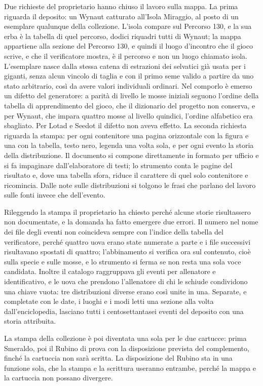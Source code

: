 Due richieste del proprietario hanno chiuso il lavoro sulla mappa. La prima riguarda il deposito: un Wynaut catturato all'Isola Miraggio, al posto di un esemplare qualunque della collezione. L'isola compare sul Percorso 130, e la sua erba è la tabella di quel percorso, dodici riquadri tutti di Wynaut; la mappa appartiene alla sezione del Percorso 130, e quindi il luogo d'incontro che il gioco scrive, e che il verificatore mostra, è il percorso e non un luogo chiamato isola. L'esemplare nasce dalla stessa catena di estrazioni dei selvatici già usata per i giganti, senza alcun vincolo di taglia e con il primo seme valido a partire da uno stato arbitrario, così da avere valori individuali ordinari. Nel comporlo è emerso un difetto del generatore: a parità di livello le mosse iniziali seguono l'ordine della tabella di apprendimento del gioco, che il dizionario del progetto non conserva, e per Wynaut, che impara quattro mosse al livello quindici, l'ordine alfabetico era sbagliato. Per Lotad e Seedot il difetto non aveva effetto. La seconda richiesta riguarda la stampa: per ogni contenitore una pagina orizzontale con la figura e una con la tabella, testo nero, legenda una volta sola, e per ogni evento la storia della distribuzione. Il documento si compone direttamente in formato per ufficio e si fa impaginare dall'elaboratore di testi; lo strumento conta le pagine del risultato e, dove una tabella sfora, riduce il carattere di quel solo contenitore e ricomincia. Dalle note sulle distribuzioni si tolgono le frasi che parlano del lavoro sulle fonti invece che dell'evento.

Rileggendo la stampa il proprietario ha chiesto perché alcune storie risultassero non documentate, e la domanda ha fatto emergere due errori. Il numero nel nome dei file degli eventi non coincideva sempre con l'indice della tabella del verificatore, perché quattro uova erano state numerate a parte e i file successivi risultavano spostati di quattro; l'abbinamento si verifica ora sul contenuto, cioè sulla specie e sulle mosse, e lo strumento si ferma se non resta una sola voce candidata. Inoltre il catalogo raggruppava gli eventi per allenatore e identificativo, e le uova che prendono l'allenatore di chi le schiude condividono una chiave vuota: tre distribuzioni diverse erano così unite in una. Separate, e completate con le date, i luoghi e i modi letti una sezione alla volta dall'enciclopedia, lasciano tutti i centosettantasei eventi del deposito con una storia attribuita.

La stampa della collezione è poi diventata una sola per le due cartucce: prima Smeraldo, poi il Rubino di prova con la disposizione prevista del complemento, finché la cartuccia non sarà scritta. La disposizione del Rubino sta in una funzione sola, che la stampa e la scrittura useranno entrambe, perché la mappa e la cartuccia non possano divergere.
